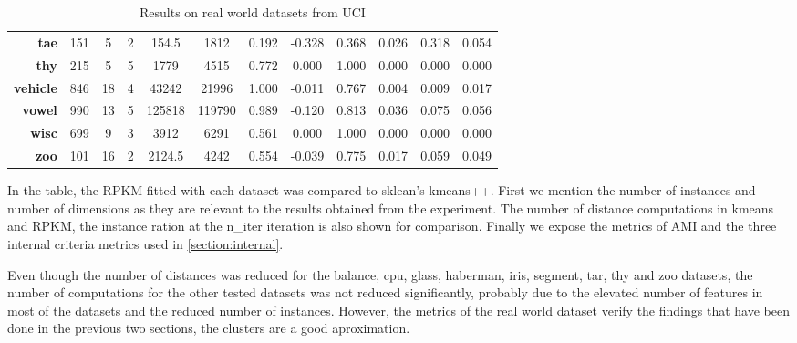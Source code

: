 \begin{table}[ht!]
{\begin{tabular}{|r|ccccccccccc|}
    \textbf{tae}           & 151                 & 5               & 2                & 154.5               & 1812                & 0.192                    & -0.328            & 0.368        & 0.026               & 0.318               & 0.054               \\
    \textbf{thy}           & 215                 & 5               & 5                & 1779                & 4515                & 0.772                    & 0.000             & 1.000        & 0.000               & 0.000               & 0.000               \\
    \textbf{vehicle}       & 846                 & 18              & 4                & 43242               & 21996               & 1.000                    & -0.011            & 0.767        & 0.004               & 0.009               & 0.017               \\
    \textbf{vowel}         & 990                 & 13              & 5                & 125818              & 119790              & 0.989                    & -0.120            & 0.813        & 0.036               & 0.075               & 0.056               \\
    \textbf{wisc}          & 699                 & 9               & 3                & 3912                & 6291                & 0.561                    & 0.000             & 1.000        & 0.000               & 0.000               & 0.000               \\
    \textbf{zoo}           & 101                 & 16              & 2                & 2124.5              & 4242                & 0.554                    & -0.039            & 0.775        & 0.017               & 0.059               & 0.049               \\ \hline
    \end{tabular}}
    \caption{Results on real world datasets from UCI}
    \label{table:real}
\end{table}

In the table, the RPKM fitted with each dataset was compared to sklean's kmeans++. First we mention the number of instances and number of dimensions as they are relevant to the results obtained from the experiment. The number of distance computations in kmeans and RPKM, the instance ration at the n\_iter iteration is also shown for comparison. Finally we expose the metrics of AMI and the three internal criteria metrics used in \ref{section:internal}. 

Even though the number of distances was reduced for the balance, cpu, glass, haberman, iris, segment, tar, thy and zoo datasets, the number of computations for the other tested datasets was not reduced significantly, probably due to the elevated number of features in most of the datasets and the reduced number of instances. However, the metrics of the real world dataset verify the findings that have been done in the previous two sections, the clusters are a good aproximation.
